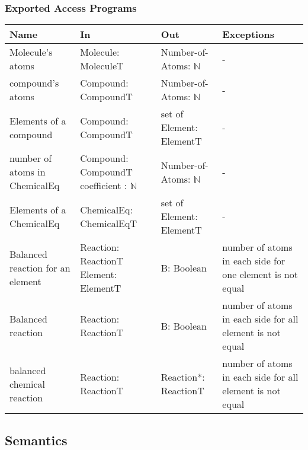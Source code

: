 \documentclass[12pt, titlepage]{article}
\begin{document}
\subsubsection{Exported Access Programs}

\begin{center}
\begin{tabular}{p{2cm} p{4cm} p{4cm} p{2cm}}
\hline
\textbf{Name} & \textbf{In} & \textbf{Out} & \textbf{Exceptions} \\
\hline
{Molecule's atoms} & Molecule: \newline MoleculeT &  Number-of-Atoms: $\mathbb{N}$  & -  \\
\hline
{compound's atoms} & Compound: \newline CompoundT &  Number-of-Atoms: $\mathbb{N}$  & -  \\
\hline
{Elements of a compound} & Compound: \newline CompoundT & set of Element: ElementT  & -  \\
\hline
{number of atoms in ChemicalEq} & Compound: \newline CompoundT
\newline coefficient :  $\mathbb{N}$ &  Number-of-Atoms: $\mathbb{N}$  & -  \\
\hline
{Elements of a ChemicalEq} & ChemicalEq: \newline ChemicalEqT & set of Element: ElementT  & -  \\
\hline
{Balanced reaction for an element} & Reaction: \newline ReactionT
 \newline Element: ElementT &  B: Boolean  & number of atoms in each side for one element is not equal \\
\hline
{Balanced reaction} & Reaction: \newline ReactionT &  B: Boolean  & number of atoms in each side for all element is not equal \\
\hline
{balanced chemical reaction} & Reaction: \newline ReactionT &  Reaction*: ReactionT  & number of atoms in each side for all element is not equal \\
\hline
\end{tabular}
\end{center}

\subsection{Semantics}
\end{document}
